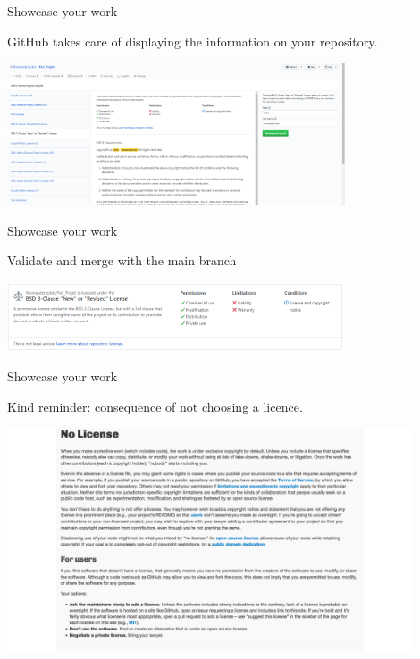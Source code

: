 \begin{frame}{Showcase your work}

GitHub takes care of displaying the information on your repository.

\begin{center}
    \includegraphics[width=10cm]{08_sharing/images/github_licence_show.png}
\end{center}

\end{frame}

\begin{frame}{Showcase your work}

Validate and merge with the main branch

\begin{center}
    \includegraphics[width=10cm]{08_sharing/images/github_licence_details.png}
\end{center}

\end{frame}

\begin{frame}{Showcase your work}

Kind reminder: consequence of not choosing a licence.

\begin{center}
    \includegraphics[width=12cm]{08_sharing/images/github_nolicence.png}
\end{center}

\end{frame}

